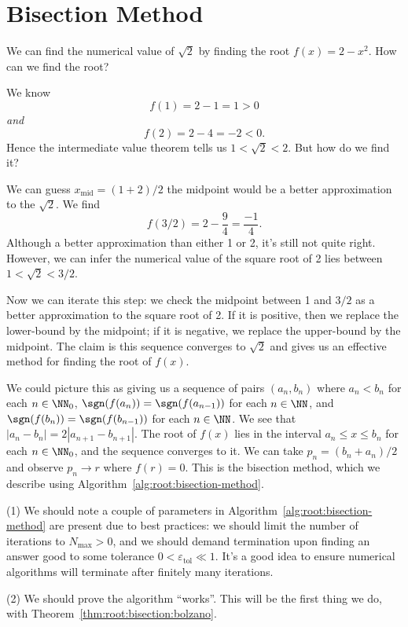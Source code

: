 \section{Bisection Method}

\begin{ex}
We can find the numerical value of $\sqrt{2}$ by finding the root
$f(x)=2-x^{2}$. How can we find the root?

We know
\begin{equation}
  f(1) = 2-1=1>0
\end{equation}
\emph{and}
\begin{equation}
  f(2) = 2 - 4 = -2 < 0.
\end{equation}
Hence the intermediate value theorem tells us $1<\sqrt{2}<2$. But how do
we find it?

We can guess $x_{\text{mid}}=(1 + 2)/2$ the midpoint would be a better
approximation to the $\sqrt{2}$. We find
\begin{equation}
  f(3/2) = 2 - \frac{9}{4} = \frac{-1}{4}.
\end{equation}
Although a better approximation than either 1 or 2, it's still not quite
right. However, we can infer the numerical value of the square root of 2
lies between $1 < \sqrt{2} < 3/2$.

Now we can iterate this step: we check the midpoint between 1 and $3/2$
as a better approximation to the square root of 2. If it is positive,
then we replace the lower-bound by the midpoint; if it is negative, we
replace the upper-bound by the midpoint. The claim is this sequence
converges to $\sqrt{2}$ and gives us an effective method for finding the
root of $f(x)$.
\end{ex}

We could picture this as giving us a sequence of pairs $(a_{n},b_{n})$
where $a_{n}<b_{n}$ for each $n\in\NN_{0}$,
$\sgn(f(a_{n}))=\sgn(f(a_{n-1}))$ for each $n\in\NN$, and
$\sgn(f(b_{n}))=\sgn(f(b_{n-1}))$ for each $n\in\NN$. We see that
$|a_{n}-b_{n}|=2|a_{n+1}-b_{n+1}|$. The root of $f(x)$ lies in the
interval $a_{n}\leq x\leq b_{n}$ for each $n\in\NN_{0}$, and the sequence
converges to it. We can take $p_{n}=(b_{n}+a_{n})/2$ and observe
$p_{n}\to r$ where $f(r)=0$. This is the bisection method, which we
describe using Algorithm~\ref{alg:root:bisection-method}.

\begin{lesson}
(1) We should note a couple of parameters in Algorithm~\ref{alg:root:bisection-method}
are present due to best practices: we should limit the number of
iterations to $N_{\text{max}}>0$, and we should demand termination upon
finding an answer good to some tolerance $0<\varepsilon_{\text{tol}}\ll1$.
It's a good idea to ensure numerical algorithms will terminate after
finitely many iterations.

(2) We should prove the algorithm ``works''. This will be the first
thing we do, with Theorem~\ref{thm:root:bisection:bolzano}.
\end{lesson}

